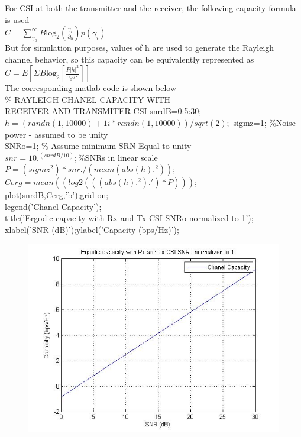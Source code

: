 \documentclass{article}
\begin{document}
For CSI at both the transmitter and the receiver, the following capacity formula is used\\
$C=\sum _{{\gamma }_{0}}^{\infty }B{\mathrm{log}}_{2}\left(\frac{{\gamma }_{i}}{{\partial }_{0}}\right)p\left({\gamma }_{i}\right)$\\ But for simulation purposes, values of h are used to generate the Rayleigh channel behavior, so this capacity can be equivalently represented as\\
$C=E\left[\Sigma B{\mathrm{log}}_{2}\left[\frac{P{\left|h\right|}^{2}}{{\gamma}_{0}\sigma^2}\right]\right]$\\ The corresponding matlab code is shown below\\
\% RAYLEIGH CHANEL CAPACITY WITH \\RECEIVER AND TRANSMITER CSI
snrdB=0:5:30; %
$h=(randn(1,10000) + 1i*randn(1,10000))/sqrt(2);$ %
sigmz=1; \%Noise power - assumed to be unity\\
SNRo=1; \% Assume minimum SRN Equal to unity\\
$snr = 10.^(snrdB/10); $\%SNRs in linear scale%
$P=(sigmz^2)*snr./(mean(abs(h).^2));$\\ %
$Cerg = mean((log2(((abs(h).^2).')*P)));$\\
plot(snrdB,Cerg,'b');grid on;\\
legend('Chanel Capacity');\\
title('Ergodic capacity with Rx and Tx CSI SNRo normalized to 1');\\
xlabel('SNR (dB)');ylabel('Capacity (bps/Hz)');\\

\begin{figure}
\centering
\includegraphics[width=1\linewidth]{RxTxCSI}
\caption{}
\label{fig:RxTxCSI}
\end{figure}
\end{document}

